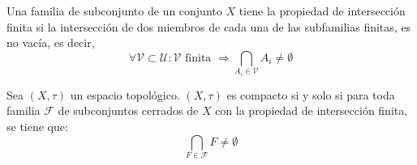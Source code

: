 \begin{definición}
    Una familia de subconjunto de un conjunto $X$ tiene la propiedad de intersección finita si la intersección de dos miembros de cada una de las subfamilias finitas, es no vacía, es decir,
    $$\forall \mathcal{V} \subset \mathcal{U} : \mathcal{V} \text{ finita } \Rightarrow \bigcap_{A_i \in \mathcal{V}} A_i \neq \emptyset$$
\end{definición}
\begin{proposición}
    Sea $(X, \tau)$ un espacio topológico. $(X, \tau)$ es compacto si y solo si para toda familia $\mathcal{F}$ de subconjuntos cerrados de $X$ con la propiedad de intersección finita, se tiene que:
        $$\bigcap_{F \in \mathcal{F}} F \neq \emptyset$$
\end{proposición}

